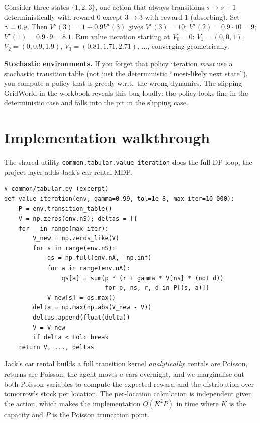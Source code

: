 \documentclass[11pt,oneside]{scrbook}
\begin{document}
\begin{example}
Consider three states $\{1,2,3\}$, one action that always transitions
$s\to s+1$ deterministically with reward 0 except $3\to 3$ with reward $1$
(absorbing). Set $\gamma=0.9$. Then $V^\star(3) = 1 + 0.9 V^\star(3)$ gives
$V^\star(3) = 10$; $V^\star(2) = 0.9\cdot 10 = 9$; $V^\star(1) = 0.9 \cdot 9 = 8.1$.
Run value iteration starting at $V_0 = 0$: $V_1 = (0,0,1)$, $V_2=(0, 0.9, 1.9)$,
$V_3=(0.81, 1.71, 2.71)$, $\dots$, converging geometrically.
\end{example}

\begin{pitfall}
\textbf{Stochastic environments.} If you forget that policy iteration
\emph{must} use a stochastic transition table (not just the deterministic
``most-likely next state''), you compute a policy that is greedy w.r.t.\ the
wrong dynamics. The slipping GridWorld in the workbook reveals this bug
loudly: the policy looks fine in the deterministic case and falls into the
pit in the slipping case.
\end{pitfall}

\chapter{Implementation walkthrough}

The shared utility \verb|common.tabular.value_iteration| does the full DP loop;
the project layer adds Jack's car rental MDP.

\begin{codebox}
\begin{verbatim}
# common/tabular.py (excerpt)
def value_iteration(env, gamma=0.99, tol=1e-8, max_iter=10_000):
    P = env.transition_table()
    V = np.zeros(env.nS); deltas = []
    for _ in range(max_iter):
        V_new = np.zeros_like(V)
        for s in range(env.nS):
            qs = np.full(env.nA, -np.inf)
            for a in range(env.nA):
                qs[a] = sum(p * (r + gamma * V[ns] * (not d))
                            for p, ns, r, d in P[(s, a)])
            V_new[s] = qs.max()
        delta = np.max(np.abs(V_new - V))
        deltas.append(float(delta))
        V = V_new
        if delta < tol: break
    return V, ..., deltas
\end{verbatim}
\end{codebox}

Jack's car rental builds a full transition kernel \emph{analytically}: rentals
are Poisson, returns are Poisson, the agent moves $a$ cars overnight, and we
marginalise out both Poisson variables to compute the expected reward and the
distribution over tomorrow's stock per location. The per-location calculation
is independent given the action, which makes the implementation $O(K^2 P)$
in time where $K$ is the capacity and $P$ is the Poisson truncation point.
\end{document}
